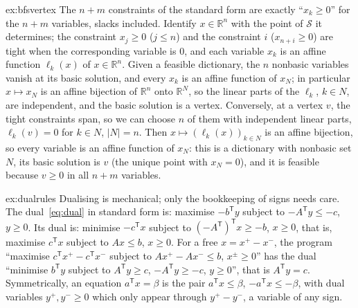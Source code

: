\begin{solution}{ex:bfsvertex}
\idea The $n+m$ constraints of the standard form are exactly ``$x_k\ge0$'' for the $n+m$ variables, slacks included.
\writeup Identify $x\in\mathbb R^n$ with the point of $\mathcal S$ it determines; the constraint $x_j\ge0$ ($j\le n$) and the constraint $i$ ($x_{n+i}\ge0$) are tight when the corresponding variable is $0$, and each variable $x_k$ is an affine function
$\ell_k(x)$ of $x\in\mathbb R^n$. Given a feasible dictionary, the $n$ nonbasic variables vanish at its basic solution, and every $x_k$ is an affine function of $x_N$; in particular $x\mapsto x_N$ is an affine bijection of $\mathbb R^n$ onto $\mathbb R^N$, so the
linear parts of the $\ell_k$, $k\in N$, are independent, and the basic solution is a vertex. Conversely, at a vertex $v$, the tight constraints span, so we can choose $n$ of them with independent linear parts, $\ell_k(v)=0$ for $k\in N$, $|N|=n$. Then
$x\mapsto(\ell_k(x))_{k\in N}$ is an affine bijection, so every variable is an affine function of $x_N$: this is a dictionary with nonbasic set $N$, its basic solution is $v$ (the unique point with $x_N=0$), and it is feasible because $v\ge0$ in all
$n+m$ variables.
\end{solution}

\begin{solution}{ex:dualrules}
\idea Dualising is mechanical; only the bookkeeping of signs needs care.
\writeup The dual~\eqref{eq:dual} in standard form is: maximise $-b^{\mathsf T}y$ subject to $-A^{\mathsf T}y\le-c$, $y\ge0$. Its dual is: minimise $-c^{\mathsf T}x$ subject to $(-A^{\mathsf T})^{\mathsf T}x\ge-b$, $x\ge0$, that is, maximise $c^{\mathsf T}x$ subject to
$Ax\le b$, $x\ge0$. For a free $x=x^+-x^-$, the program ``maximise $c^{\mathsf T}x^+-c^{\mathsf T}x^-$ subject to $Ax^+-Ax^-\le b$, $x^\pm\ge0$'' has the dual ``minimise $b^{\mathsf T}y$ subject to $A^{\mathsf T}y\ge c$, $-A^{\mathsf T}y\ge-c$, $y\ge0$'', that is $A^{\mathsf T}y=c$.
Symmetrically, an equation $a^{\mathsf T}x=\beta$ is the pair $a^{\mathsf T}x\le\beta$, $-a^{\mathsf T}x\le-\beta$, with dual variables $y^+,y^-\ge0$ which only appear through $y^+-y^-$, a variable of any sign.
\end{solution}

